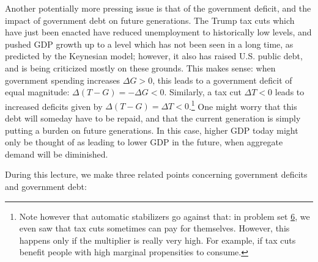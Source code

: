 \documentclass[]{book}
\let\rmarkdownfootnote\footnote%
\def\footnote{\protect\rmarkdownfootnote}
\begin{document}
Another potentially more pressing issue is that of the government
deficit, and the impact of government debt on future generations. The
Trump tax cuts which have just been enacted have reduced unemployment to
historically low levels, and pushed GDP growth up to a level which has
not been seen in a long time, as predicted by the Keynesian model;
however, it also has raised U.S. public debt, and is being criticized
mostly on these grounds. This makes sense: when government spending
increases \(\Delta G>0\), this leads to a government deficit of equal
magnitude: \(\Delta (T-G) = -\Delta G<0.\) Similarly, a tax cut
\(\Delta T<0\) leads to increased deficits given by
\(\Delta (T-G) = \Delta T<0\).\footnote{Note however that automatic
  stabilizers go against that: in problem set
  \protect\hyperlink{pset6}{6}, we even saw that tax cuts sometimes can
  pay for themselves. However, this happens only if the multiplier is
  really very high. For example, if tax cuts benefit people with high
  marginal propensities to consume.} One might worry that this debt will
someday have to be repaid, and that the current generation is simply
putting a burden on future generations. In this case, higher GDP today
might only be thought of as leading to lower GDP in the future, when
aggregate demand will be diminished.

During this lecture, we make three related points concerning government
deficits and government debt:
\end{document}
